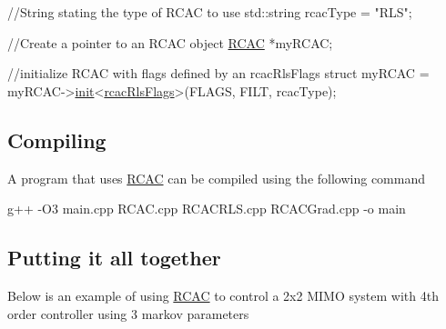 \begin{DoxyCode}
\textcolor{comment}{//String stating the type of RCAC to use}
std::string rcacType = \textcolor{stringliteral}{"RLS"};

\textcolor{comment}{//Create a pointer to an RCAC object}
\hyperlink{class_r_c_a_c}{RCAC} *myRCAC;

\textcolor{comment}{//initialize RCAC with flags defined by an rcacRlsFlags struct}
myRCAC = myRCAC->\hyperlink{class_r_c_a_c_af7b7133b676886d5010be725291c1a1d}{init}<\hyperlink{structrcac_rls_flags}{rcacRlsFlags}>(FLAGS, FILT, rcacType);
\end{DoxyCode}


\subsection*{Compiling }

A program that uses \hyperlink{class_r_c_a_c}{R\+C\+AC} can be compiled using the following command 
\begin{DoxyCode}
g++ -O3 main.cpp RCAC.cpp RCACRLS.cpp RCACGrad.cpp -o main
\end{DoxyCode}


\subsection*{Putting it all together }

Below is an example of using \hyperlink{class_r_c_a_c}{R\+C\+AC} to control a 2x2 M\+I\+MO system with 4th order controller using 3 markov parameters



